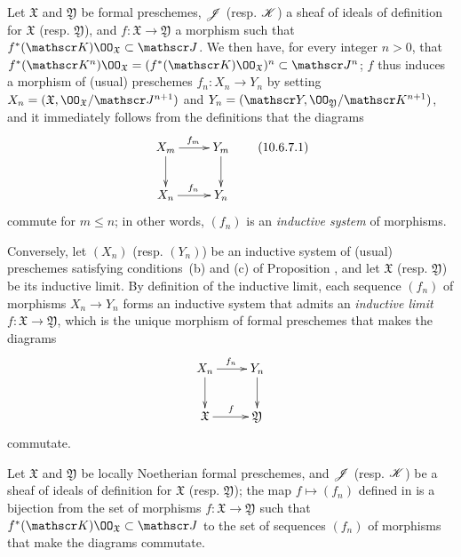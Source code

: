\begin{env}[10.6.7]
\label{1.10.6.7}
Let $\mathfrak{X}$ and $\mathfrak{Y}$ be formal preschemes, $\mathscr{J}$ (resp. $\mathscr{K}$) a sheaf of ideals of definition for $\mathfrak{X}$ (resp. $\mathfrak{Y}$), and $f:\mathfrak{X}\to\mathfrak{Y}$ a morphism such that $f^*(\sh{K})\OO_\mathfrak{X}\subset\sh{J}$.
We then have, for every integer $n>0$, that $f^*(\sh{K}^n)\OO_\mathfrak{X}=(f^*(\sh{K})\OO_\mathfrak{X})^n\subset\sh{J}^n$; $f$ thus induces  a morphism of (usual) preschemes $f_n:X_n\to Y_n$ by setting $X_n=(\mathfrak{X},\OO_\mathfrak{X}/\sh{J}^{n+1})$ and $Y_n=(\sh{Y},\OO_\mathfrak{Y}/\sh{K}^{n+1})$, and it immediately follows from the definitions that the diagrams
\begin{equation*}
\label{1.10.6.7.1}
  \xymatrix{
    X_m\ar[r]^{f_m}\ar[d] &
    Y_m\ar[d]\\
    X_n\ar[r]^{f_n} &
    Y_n
  }
  \tag{10.6.7.1}
\end{equation*}
commute for $m\leq n$; in other words, $(f_n)$ is an \emph{inductive system} of morphisms.
\end{env}

\begin{env}[10.6.8]
\label{1.10.6.8}
Conversely, let $(X_n)$ (resp. $(Y_n)$) be an inductive system of (usual) preschemes satisfying conditions~(b) and (c) of Proposition , and let $\mathfrak{X}$ (resp. $\mathfrak{Y}$) be its inductive limit.
By definition of the inductive limit, each sequence $(f_n)$ of morphisms $X_n\to Y_n$ forms an inductive system that admits an \emph{inductive limit $f:\mathfrak{X}\to\mathfrak{Y}$}, which is the unique morphism of formal preschemes that makes the diagrams
\[
  \xymatrix{
    X_n\ar[r]^{f_n}\ar[d] &
    Y_n\ar[d]\\
    \mathfrak{X}\ar[r]^f &
    \mathfrak{Y}
  }
\]
commutate.
\end{env}

\begin{prop}[10.6.9]
\label{1.10.6.9}
Let $\mathfrak{X}$ and $\mathfrak{Y}$ be locally Noetherian formal preschemes, and $\mathscr{J}$ (resp. $\mathscr{K}$) be a sheaf of ideals of definition for $\mathfrak{X}$ (resp. $\mathfrak{Y}$); the map $f\mapsto(f_n)$ defined in  is a bijection from the set of morphisms $f:\mathfrak{X}\to\mathfrak{Y}$ such that $f^*(\sh{K})\OO_\mathfrak{X}\subset\sh{J}$ to the set of sequences $(f_n)$ of morphisms that make the diagrams  commutate.
\end{prop}

